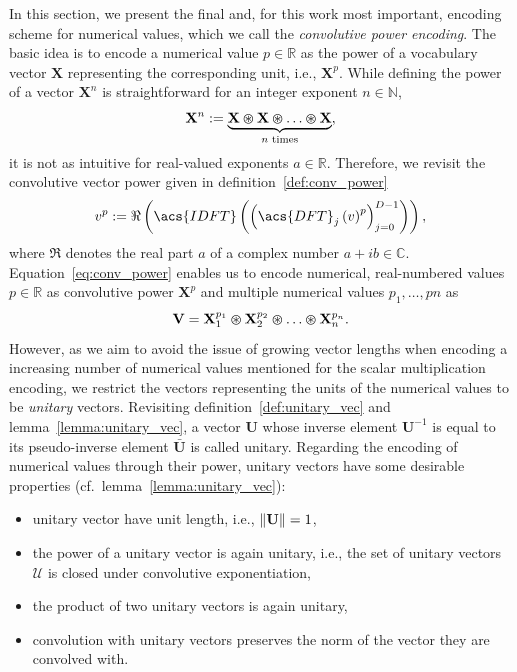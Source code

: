 In this section, we present the final and, for this work most important, encoding scheme for numerical values, which we call the \emph{convolutive power encoding}.
The basic idea is to encode a numerical value $p \in \mathbb{R} $ as the power of a vocabulary vector $ \mathbf{X} $ representing the corresponding unit, i.e., $ \mathbf{X}^{p} $.
While defining the power of a vector $ \mathbf{X}^{n} $ is straightforward for an integer exponent $ n \in \mathbb{N} $,
\begin{equation}
\label{eq:vector_power_integer}
\mathbf{X}^{n} := \underbrace{ \mathbf{X} \varoast \mathbf{X} \varoast \ldots \varoast \mathbf{X} }_{\textrm{$n$ times}},
\end{equation}
it is not as intuitive for real-valued exponents $a \in \mathbb{R} $.
Therefore, we revisit the convolutive vector power given in definition~\ref{def:conv_power} 
\begin{equation}
\label{eq:conv_power}
v^{p} := \Re\left(\acs{IDFT} \left(\left(\acs{DFT}_{j}\left(v\right)^{p}\right)_{j=0}^{D-1}\right)\right),
\end{equation}
where $\Re$ denotes the real part $a$ of a complex number $a + ib \in \mathbb{C}$.
Equation~\eqref{eq:conv_power} enables us to encode numerical, real-numbered values $p \in \mathbb{R} $ as convolutive power $ \mathbf{X}^{p}$ and multiple numerical values $ p_{1}, \ldots, p{n}$ as
\begin{equation}
\label{eq:conv_power_several}
\mathbf{V} = \mathbf{X}_{1}^{p_{1}} \varoast \mathbf{X}_{2}^{p_{2}} \varoast \ldots \varoast \mathbf{X}_{n}^{p_{n}}.
\end{equation}
However, as we aim to avoid the issue of growing vector lengths when encoding a increasing number of numerical values mentioned for the scalar multiplication encoding, we restrict the vectors representing the units of the numerical values to be \emph{unitary} vectors.
Revisiting definition~\ref{def:unitary_vec} and lemma~\ref{lemma:unitary_vec}, a vector $ \mathbf{U}$ whose inverse element $ \mathbf{U}^{-1} $ is equal to its pseudo-inverse element $ \bar{\mathbf{U}} $ is called unitary.
Regarding the encoding of numerical values through their power, unitary vectors have some desirable properties (cf.\ lemma~\ref{lemma:unitary_vec}): 
\begin{itemize}
    \item unitary vector have unit length, i.e., $\left\|  \mathbf{U}  \right\|=1$,
    \item the power of a unitary vector is again unitary, i.e., the set of unitary vectors $ \mathcal{U} $ is closed under convolutive exponentiation,
    \item the product of two unitary vectors is again unitary,
    \item convolution with unitary vectors preserves the norm of the vector they are convolved with.
\end{itemize}

